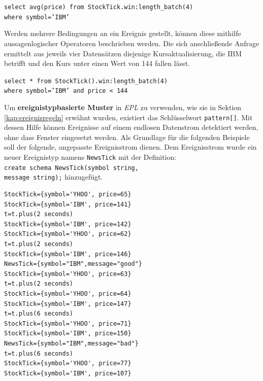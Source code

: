 \documentclass{acm_proc_article-sp}
\begin{document}
\texttt{select  avg(price) from StockTick.win:length\_batch(4)\\where symbol='IBM'}
\begin{table}[ht]
    \caption{\texttt{batch}-Längenfenster}
    \label{table:warteschlange-batch}\vspace{0.2cm}
\end{table}

Werden mehrere Bedingungen an ein Ereignis gestellt, können diese mithilfe 
aussagenlogischer Operatoren beschrieben werden. Die sich anschließende Anfrage ermittelt 
aus jeweils vier Datensätzen diejenige Kursaktualisierung, die IBM betrifft und den Kurs 
unter einen Wert von 144 fallen lässt.

\texttt{select * from StockTick().win:length\_batch(4)\\where symbol='IBM' and 
price < 144}

Um \textbf{ereignistypbasierte Muster} in \textit{EPL} zu verwenden, wie sie in Sektion 
\ref{kap:ereignisregeln} erwähnt wurden, existiert das Schlüsselwort \texttt{pattern[]}. 
Mit dessen Hilfe können Ereignisse auf einem endlosen Datenstrom detektiert werden, ohne 
dass Fenster eingesetzt werden. Als Grundlage für die folgenden Beispiele soll der 
folgende, angepasste Ereignisstrom dienen. Dem Ereignisstrom wurde ein neuer Ereignistyp 
namens 
\texttt{NewsTick} mit der Definition:\\
\texttt{create schema NewsTick(symbol string,\\message string);} hinzugefügt.
\begin{verbatim}
StockTick={symbol='YHOO', price=65}
StockTick={symbol='IBM', price=141}
t=t.plus(2 seconds)
StockTick={symbol='IBM', price=142}
StockTick={symbol='YHOO', price=62}
t=t.plus(2 seconds)
StockTick={symbol='IBM', price=146}
NewsTick={symbol="IBM",message="good"}
StockTick={symbol='YHOO', price=63}
t=t.plus(2 seconds)
StockTick={symbol='YHOO', price=64}
StockTick={symbol='IBM', price=147}
t=t.plus(6 seconds)
StockTick={symbol='YHOO', price=71}
StockTick={symbol='IBM', price=150}
NewsTick={symbol="IBM",message="bad"}
t=t.plus(6 seconds)
StockTick={symbol='YHOO', price=77}
StockTick={symbol='IBM', price=107}
\end{verbatim}
\end{document}
